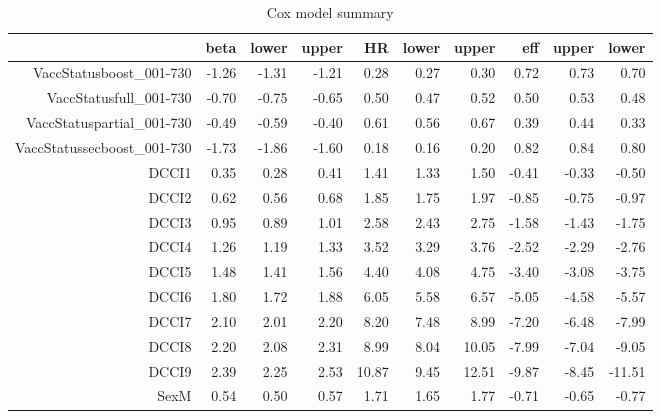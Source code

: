 \begin{table}[ht]
\centering
\begin{tabular}{rrrrrrrrrr}
  \hline
 & beta & lower & upper & HR & lower & upper & eff & upper & lower \\ 
  \hline
VaccStatusboost\_001-730 & -1.26 & -1.31 & -1.21 & 0.28 & 0.27 & 0.30 & 0.72 & 0.73 & 0.70 \\ 
  VaccStatusfull\_001-730 & -0.70 & -0.75 & -0.65 & 0.50 & 0.47 & 0.52 & 0.50 & 0.53 & 0.48 \\ 
  VaccStatuspartial\_001-730 & -0.49 & -0.59 & -0.40 & 0.61 & 0.56 & 0.67 & 0.39 & 0.44 & 0.33 \\ 
  VaccStatussecboost\_001-730 & -1.73 & -1.86 & -1.60 & 0.18 & 0.16 & 0.20 & 0.82 & 0.84 & 0.80 \\ 
  DCCI1 & 0.35 & 0.28 & 0.41 & 1.41 & 1.33 & 1.50 & -0.41 & -0.33 & -0.50 \\ 
  DCCI2 & 0.62 & 0.56 & 0.68 & 1.85 & 1.75 & 1.97 & -0.85 & -0.75 & -0.97 \\ 
  DCCI3 & 0.95 & 0.89 & 1.01 & 2.58 & 2.43 & 2.75 & -1.58 & -1.43 & -1.75 \\ 
  DCCI4 & 1.26 & 1.19 & 1.33 & 3.52 & 3.29 & 3.76 & -2.52 & -2.29 & -2.76 \\ 
  DCCI5 & 1.48 & 1.41 & 1.56 & 4.40 & 4.08 & 4.75 & -3.40 & -3.08 & -3.75 \\ 
  DCCI6 & 1.80 & 1.72 & 1.88 & 6.05 & 5.58 & 6.57 & -5.05 & -4.58 & -5.57 \\ 
  DCCI7 & 2.10 & 2.01 & 2.20 & 8.20 & 7.48 & 8.99 & -7.20 & -6.48 & -7.99 \\ 
  DCCI8 & 2.20 & 2.08 & 2.31 & 8.99 & 8.04 & 10.05 & -7.99 & -7.04 & -9.05 \\ 
  DCCI9 & 2.39 & 2.25 & 2.53 & 10.87 & 9.45 & 12.51 & -9.87 & -8.45 & -11.51 \\ 
  SexM & 0.54 & 0.50 & 0.57 & 1.71 & 1.65 & 1.77 & -0.71 & -0.65 & -0.77 \\ 
   \hline
\end{tabular}
\caption{Cox model summary} 
\end{table}
